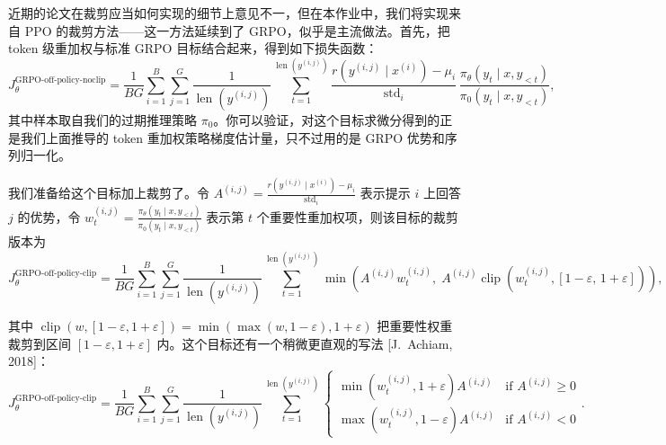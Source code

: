近期的论文在裁剪应当如何实现的细节上意见不一，但在本作业中，我们将实现来自 PPO 的裁剪方法——这一方法延续到了 GRPO，似乎是主流做法。首先，把 token 级重加权与标准 GRPO 目标结合起来，得到如下损失函数：
\begin{equation}
J_\theta^{\text{GRPO-off-policy-noclip}} = \frac{1}{BG}\sum_{i=1}^{B}\sum_{j=1}^{G}\frac{1}{\operatorname{len}\!\left(y^{(i,j)}\right)}\sum_{t=1}^{\operatorname{len}\!\left(y^{(i,j)}\right)} \frac{r\!\left(y^{(i,j)} \mid x^{(i)}\right) - \mu_i}{\operatorname{std}_i}\, \frac{\pi_\theta(y_t \mid x, y_{<t})}{\pi_0(y_t \mid x, y_{<t})},
\end{equation}
其中样本取自我们的过期推理策略 $\pi_0$。你可以验证，对这个目标求微分得到的正是我们上面推导的 token 重加权策略梯度估计量，只不过用的是 GRPO 优势和序列归一化。

我们准备给这个目标加上裁剪了。令 $A^{(i,j)} = \frac{r\left(y^{(i,j)} \mid x^{(i)}\right) - \mu_i}{\operatorname{std}_i}$ 表示提示 $i$ 上回答 $j$ 的优势，令 $w_t^{(i,j)} = \frac{\pi_\theta(y_t \mid x, y_{<t})}{\pi_0(y_t \mid x, y_{<t})}$ 表示第 $t$ 个重要性重加权项，则该目标的裁剪版本为
\begin{equation}
J_\theta^{\text{GRPO-off-policy-clip}} = \frac{1}{BG}\sum_{i=1}^{B}\sum_{j=1}^{G}\frac{1}{\operatorname{len}\!\left(y^{(i,j)}\right)}\sum_{t=1}^{\operatorname{len}\!\left(y^{(i,j)}\right)} \min\!\left(A^{(i,j)}w_t^{(i,j)},\; A^{(i,j)}\operatorname{clip}\!\left(w_t^{(i,j)}, [1-\varepsilon,\, 1+\varepsilon]\right)\right),
\end{equation}

其中 $\operatorname{clip}(w, [1-\varepsilon, 1+\varepsilon]) = \min(\max(w, 1-\varepsilon), 1+\varepsilon)$ 把重要性权重裁剪到区间 $[1-\varepsilon, 1+\varepsilon]$ 内。这个目标还有一个稍微更直观的写法 [J.\ Achiam, 2018]：
\begin{equation}
J_\theta^{\text{GRPO-off-policy-clip}} = \frac{1}{BG}\sum_{i=1}^{B}\sum_{j=1}^{G}\frac{1}{\operatorname{len}\!\left(y^{(i,j)}\right)}\sum_{t=1}^{\operatorname{len}\!\left(y^{(i,j)}\right)}
\begin{cases}
\min\!\left(w_t^{(i,j)}, 1+\varepsilon\right)A^{(i,j)} & \text{if } A^{(i,j)} \geq 0\\
\max\!\left(w_t^{(i,j)}, 1-\varepsilon\right)A^{(i,j)} & \text{if } A^{(i,j)} < 0
\end{cases}.
\end{equation}

